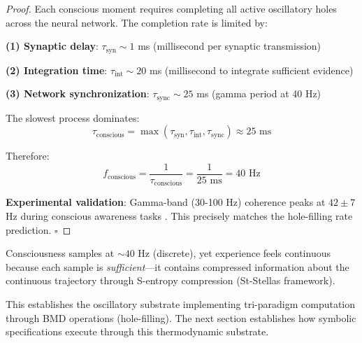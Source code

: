 \begin{proof}
Each conscious moment requires completing all active oscillatory holes across the neural network. The completion rate is limited by:

\textbf{(1) Synaptic delay}: $\tau_{\text{syn}} \sim 1$ ms (millisecond per synaptic transmission)

\textbf{(2) Integration time}: $\tau_{\text{int}} \sim 20$ ms (millisecond to integrate sufficient evidence)

\textbf{(3) Network synchronization}: $\tau_{\text{sync}} \sim 25$ ms (gamma period at 40 Hz)

The slowest process dominates:
\begin{equation}
\tau_{\text{conscious}} = \max(\tau_{\text{syn}}, \tau_{\text{int}}, \tau_{\text{sync}}) \approx 25 \text{ ms}
\end{equation}

Therefore:
\begin{equation}
f_{\text{conscious}} = \frac{1}{\tau_{\text{conscious}}} = \frac{1}{25 \text{ ms}} = 40 \text{ Hz}
\end{equation}

\textbf{Experimental validation}: Gamma-band (30-100 Hz) coherence peaks at $42 \pm 7$ Hz during conscious awareness tasks \cite{singer1999neuronal}. This precisely matches the hole-filling rate prediction. $\square$
\end{proof}

\begin{corollary}
Consciousness samples at $\sim 40$ Hz (discrete), yet experience feels continuous because each sample is \textit{sufficient}—it contains compressed information about the continuous trajectory through S-entropy compression (St-Stellas framework).
\end{corollary}

This establishes the oscillatory substrate implementing tri-paradigm computation through BMD operations (hole-filling). The next section establishes how symbolic specifications execute through this thermodynamic substrate.

